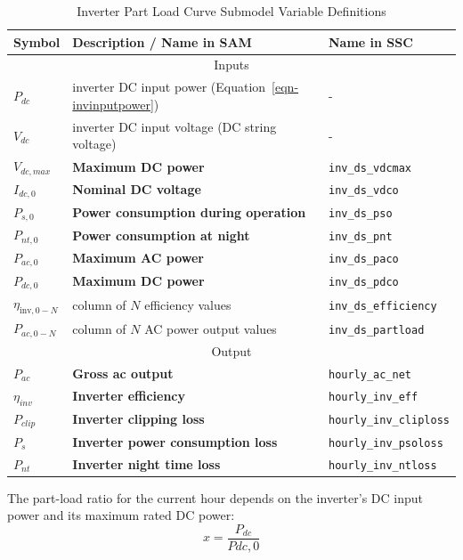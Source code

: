 \documentclass[12pt,letterpaper]{article}
\begin{document}
\begin{table}
\begin{center}
\caption{Inverter Part Load Curve Submodel Variable Definitions}
\begin{tabular}{lll}
\midrule
Symbol & Description / \textbf{Name in SAM} & Name in SSC \\
\midrule
\multicolumn{3}{c}{Inputs}\\
$P_{dc}$ & inverter DC input power (Equation~\ref{eqn-invinputpower}) & - \\
$V_{dc}$ & inverter DC input voltage (DC string voltage) & - \\
$V_{dc,max}$ & \textbf{Maximum DC power} & \texttt{inv\_ds\_vdcmax} \\
$I_{dc,0}$ & \textbf{Nominal DC voltage} & \texttt{inv\_ds\_vdco} \\
$P_{s,0}$ & \textbf{Power consumption during operation} & \texttt{inv\_ds\_pso} \\
$P_{nt,0}$ & \textbf{Power consumption at night} & \texttt{inv\_ds\_pnt} \\
$P_{ac,0}$ & \textbf{Maximum AC power} & \texttt{inv\_ds\_paco} \\
$P_{dc,0}$ & \textbf{Maximum DC power} & \texttt{inv\_ds\_pdco} \\
$\eta_{\mathrm{inv},0-N}$ & column of $N$ efficiency values & \texttt{inv\_ds\_efficiency} \\
$P_{ac,0-N}$ & column of $N$ AC power output values & \texttt{inv\_ds\_partload} \\
\midrule
\multicolumn{3}{c}{Output}\\
$P_{ac}$ & \textbf{Gross ac output} & \texttt{hourly\_ac\_net} \\
$\eta_{inv}$ & \textbf{Inverter efficiency} & \texttt{hourly\_inv\_eff}  \\
$P_{clip}$ & \textbf{Inverter clipping loss} & \texttt{hourly\_inv\_cliploss}  \\
$P_{s}$ & \textbf{Inverter power consumption loss}& \texttt{hourly\_inv\_psoloss}  \\
$P_{nt}$ & \textbf{Inverter night time loss}& \texttt{hourly\_inv\_ntloss}  \\
\hline
\end{tabular}
\label{tab-partloadinvertervars}
\end{center}
\end{table}

The part-load ratio for the current hour depends on the inverter's DC input power and its maximum rated DC power:
\begin{equation}
x = \frac{P_{dc}}{P{dc,0}}
\end{equation}
\end{document}
